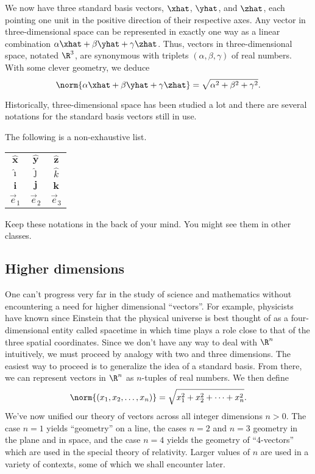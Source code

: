 We now have three standard basis vectors, $\xhat$, $\yhat$,
and $\zhat$, each pointing one unit in the positive direction of their
respective axes.
Any vector in three-dimensional
space can be represented 
in exactly one way
as a linear combination $\alpha\xhat+\beta\yhat+\gamma\zhat$.  Thus,
vectors in three-dimensional space, notated $\R^3$,
are synonymous with triplets $(\alpha,\beta,\gamma)$
of real numbers.  With some clever geometry, we deduce
\[
	\norm{\alpha\xhat+\beta\yhat+\gamma\zhat}=\sqrt{\alpha^2+\beta^2+\gamma^2}.
\]

Historically, three-dimensional space has been studied a lot and there
are several notations for the standard basis vectors still in use.

The following is a non-exhaustive list.
\begin{center}
	\begin{tabular}{c  c  c}
		$\hat{\mathbf{x}}$ & $\hat{\mathbf{y}}$ &$\hat{\mathbf{z}}$\\
		$\hat{\imath}$ & $\hat{\jmath}$ &$\hat{k}$\\
		$\mathbf{i}$ & $\mathbf j$ & $\mathbf k$\\
		$\vec e_1$ & $\vec e_2$ & $\vec e_3$
	\end{tabular}
\end{center}
Keep these notations in the back of your mind.  You might see them in other classes.

\subsection{Higher dimensions}
One can't progress very far in the study of science and mathematics
without encountering a need for higher dimensional ``vectors''.  For
example, physicists have known since Einstein that the physical
universe is best thought of as a four-dimensional entity called
spacetime in which time plays a role close to that of the 
three spatial coordinates.  Since we don't have any way to deal with
$\R^n$
intuitively, we must
proceed by analogy with two and three dimensions.
The easiest
way to proceed is to generalize the idea of a standard basis.
From there, we can represent vectors in $\R^n$ as $n$-tuples of real numbers.
We then define
\[
	\norm{(x_1,x_2,\ldots,x_n)} = \sqrt{x_1^2+x_2^2+\cdots+x_n^2}.	
\]
We've now unified our theory of vectors across all integer dimensions $n>0$.
The case $n=1$ yields  ``geometry'' on a line, 
the cases $n = 2$ and $n = 3$ geometry in the plane and in space, and
the case $n = 4$ yields the geometry of ``4-vectors'' which
are  used in the special theory of relativity.
Larger values of $n$ are used in a
variety of contexts, some of which we shall encounter later.


